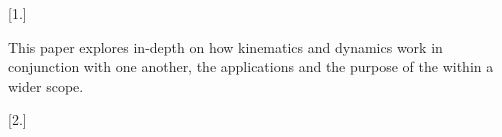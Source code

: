\documentclass[12pt]{article}
\begin{document}

[1.] \parencite{kinematics} \par This paper explores in-depth on how kinematics and dynamics work in conjunction with one another,
the applications and the purpose of the  within a wider scope.

[2.]


\printbibliography
\end{document}

